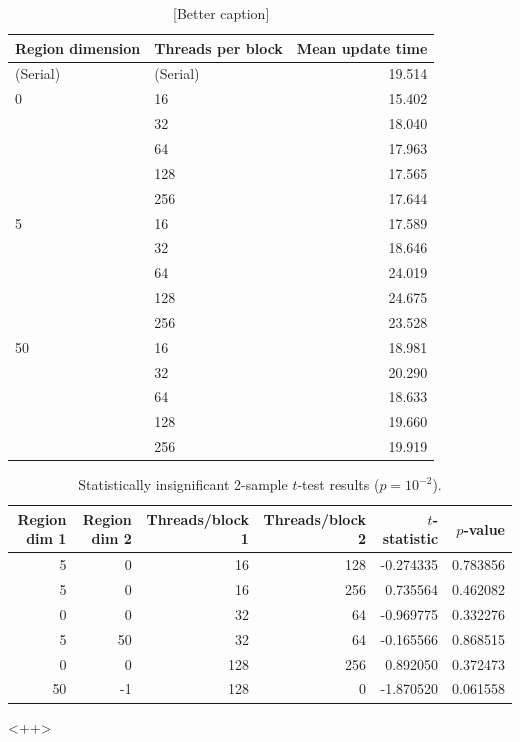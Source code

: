 \documentclass[12pt]{article}
\begin{document}
    \begin{table}
        \centering
        \begin{tabular}{llr}
            \toprule
            Region dimension & Threads per block & Mean update time \\ \midrule
            (Serial)  & (Serial)   &  19.514 \\
            0  & 16  &  15.402 \\
            & 32  &  18.040 \\
            & 64  &  17.963 \\
            & 128 &  17.565 \\
            & 256 &  17.644 \\ \midrule
            5  & 16  &  17.589 \\
            & 32  &  18.646 \\
            & 64  &  24.019 \\
            & 128 &  24.675 \\
            & 256 &  23.528 \\ \midrule
            50 & 16  &  18.981 \\
            & 32  &  20.290 \\
            & 64  &  18.633 \\
            & 128 &  19.660 \\
            & 256 & 19.919 \\ \bottomrule
        \end{tabular}
        \caption{[Better caption]}
        \label{tab:means}
    \end{table}

    \begin{table}
        \centering
        \begin{tabular}{rrrrrr} \toprule
            Region dim 1 &  Region dim 2  &
            Threads/block 1 &  Threads/block 2 &  $t$-statistic & $p$-value \\ \midrule
 5 &   0  & 16 & 128  &   -0.274335&  0.783856 \\
 5 &   0  & 16 & 256  &    0.735564&  0.462082 \\
 0 &   0  & 32 &  64  &   -0.969775&  0.332276 \\
 5 &  50  & 32 &  64  &   -0.165566&  0.868515 \\
 0 &   0  & 128 & 256 &    0.892050 &  0.372473 \\
50 &  -1  & 128 &   0 &   -1.870520 &  0.061558 \\
\bottomrule
\end{tabular}
        \caption{Statistically insignificant 2-sample $t$-test results ($p =
            10^{-2}$).}
        \label{tab:jj}
    \end{table}<++>
\end{document}
